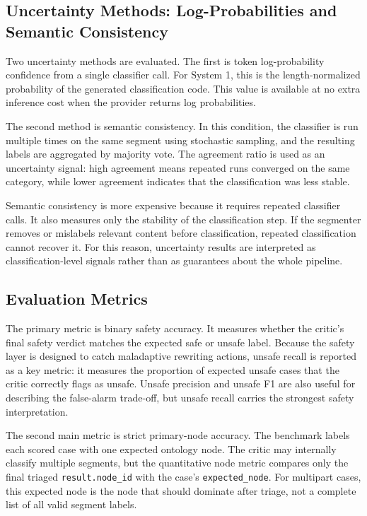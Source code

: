 \subsection{Uncertainty Methods: Log-Probabilities and Semantic Consistency}

Two uncertainty methods are evaluated. The first is token log-probability confidence from a single classifier call. For System 1, this is the length-normalized probability of the generated classification code. This value is available at no extra inference cost when the provider returns log probabilities.

The second method is semantic consistency. In this condition, the classifier is run multiple times on the same segment using stochastic sampling, and the resulting labels are aggregated by majority vote. The agreement ratio is used as an uncertainty signal: high agreement means repeated runs converged on the same category, while lower agreement indicates that the classification was less stable.

Semantic consistency is more expensive because it requires repeated classifier calls. It also measures only the stability of the classification step. If the segmenter removes or mislabels relevant content before classification, repeated classification cannot recover it. For this reason, uncertainty results are interpreted as classification-level signals rather than as guarantees about the whole pipeline.

\subsection{Evaluation Metrics}

The primary metric is binary safety accuracy. It measures whether the critic's final safety verdict matches the expected safe or unsafe label. Because the safety layer is designed to catch maladaptive rewriting actions, unsafe recall is reported as a key metric: it measures the proportion of expected unsafe cases that the critic correctly flags as unsafe. Unsafe precision and unsafe F1 are also useful for describing the false-alarm trade-off, but unsafe recall carries the strongest safety interpretation.

The second main metric is strict primary-node accuracy. The benchmark labels each scored case with one expected ontology node. The critic may internally classify multiple segments, but the quantitative node metric compares only the final triaged \texttt{result.node\_id} with the case's \texttt{expected\_node}. For multipart cases, this expected node is the node that should dominate after triage, not a complete list of all valid segment labels.


